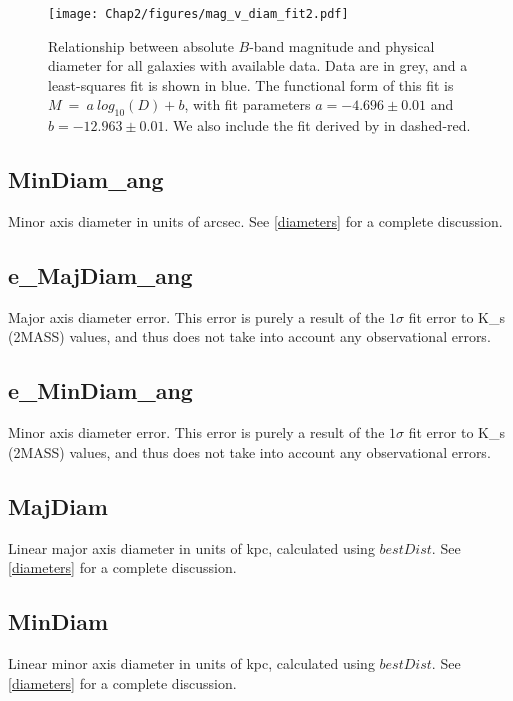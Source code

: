 \begin{figure}[ht!]
        \centering
        \vspace{0pt}
        \texttt{[image: Chap2/figures/mag\_v\_diam\_fit2.pdf]}
        \caption{\small{Relationship between absolute $B$-band magnitude and physical diameter for all galaxies with available data. Data are in grey, and a least-squares fit is shown in blue. The functional form of this fit is $M ~=~ a ~ log_{10}(D) + b$, with fit parameters $a = -4.696 \pm 0.01$ and $b = -12.963 \pm 0.01$. We also include the fit derived by \cite{wakker2009} in dashed-red.}}
        \label{magvdiam}
\end{figure}


\subsection{MinDiam\_ang} \label{MinDiam_ang}
Minor axis diameter in units of arcsec. See \ref{diameters} for a complete discussion.

\subsection{e\_MajDiam\_ang} \label{e_MinDiam_ang}
Major axis diameter error. This error is purely a result of the $1\sigma$ fit error to K\_s (2MASS) values, and thus does not take into account any observational errors.

\subsection{e\_MinDiam\_ang} \label{e_MinDiam_ang}
Minor axis diameter error. This error is purely a result of the $1\sigma$ fit error to K\_s (2MASS) values, and thus does not take into account any observational errors.

\subsection{MajDiam} \label{MajDiam}
Linear major axis diameter in units of kpc, calculated using $bestDist$. See \ref{diameters} for a complete discussion.

\subsection{MinDiam} \label{MinDiam}
Linear minor axis diameter in units of kpc, calculated using $bestDist$. See \ref{diameters} for a complete discussion.

